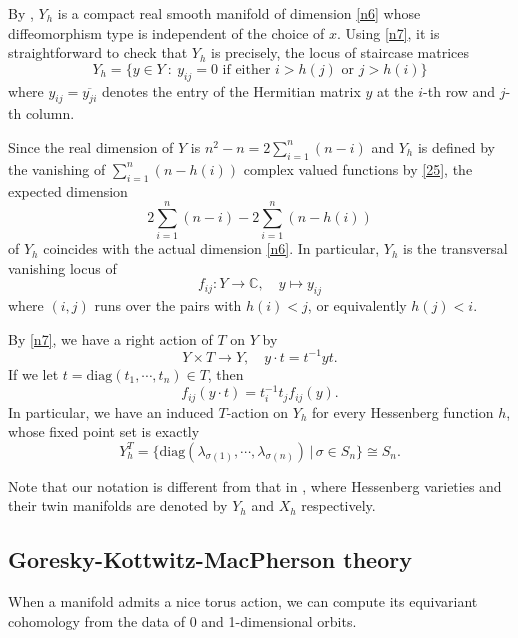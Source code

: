 \documentclass[11pt]{article}
\theoremstyle{definition}
\numberwithin{equation}{section}
\numberwithin{equation}{section}
\newcommand{\C}{\mathbb{C}}
\newcommand\lra{\longrightarrow }
\newcommand\beq{\begin{equation}}
\newcommand\eeq{\end{equation}}
\newcommand\diag{\mathrm{diag}}
\begin{document}
By \cite[Theorem 3.5]{AB},
$Y_h$ is a compact real smooth manifold of dimension \eqref{n6} whose diffeomorphism type is independent of the choice of $x$.
Using \eqref{n7}, it is straightforward to check that $Y_h$ is precisely, the locus of staircase matrices 
\beq \label{25} Y_h=\{y\in Y~:~y_{ij}=0 \text{ if either }i>h(j) \text{ or }j>h(i)\}\eeq
where $y_{ij}=\overline{y_{ji}}$ denotes the entry of the Hermitian matrix $y$ at the $i$-th row and $j$-th column. 

Since the real dimension of $Y$ is $n^2-n=2 \sum_{i=1}^{n}(n-i)$ and $Y_h$ is defined by the vanishing of $\sum_{i=1}^{n}(n-h(i))$ complex valued functions by \eqref{25}, the expected dimension 
$$2\sum_{i=1}^n(n-i)-2\sum_{i=1}^n(n-h(i))$$
of $Y_h$ coincides with the actual dimension \eqref{n6}. 
In particular, $Y_h$ is the {transversal} vanishing locus of 
\beq \label{23}f_{ij}:
Y\lra \C, \quad y\mapsto y_{ij}\eeq
where $(i,j)$ runs over the pairs with $h(i)<j$, or equivalently $h(j)<i$. 

By \eqref{n7}, we have a right action of $T$ on $Y$ by 
\beq\label{n8} Y\times T\lra Y,\quad y\cdot t=t^{-1}yt.\eeq
If we let $t=\diag(t_1,\cdots, t_n)\in T$, then 
\beq\label{24}  f_{ij}(y\cdot t)=t_i^{-1}t_jf_{ij}(y).\eeq 
In particular, we have an induced $T$-action on $Y_h$ for every Hessenberg function $h$, 
whose fixed point set is exactly 
\beq\label{n10}
Y_h^T=\{\diag(\lambda_{\sigma(1)},\cdots,\lambda_{\sigma(n)})\,|\, \sigma\in S_n\}\cong S_n.\eeq





Note that our notation is different from that in \cite{AB}, where Hessenberg varieties and their twin manifolds are denoted by $Y_h$ and $X_h$ respectively.




\subsection{Goresky-Kottwitz-MacPherson theory} 
When a manifold admits a nice torus action, we can compute its equivariant cohomology 
from the data of 0 and 1-dimensional orbits. 
\end{document}
